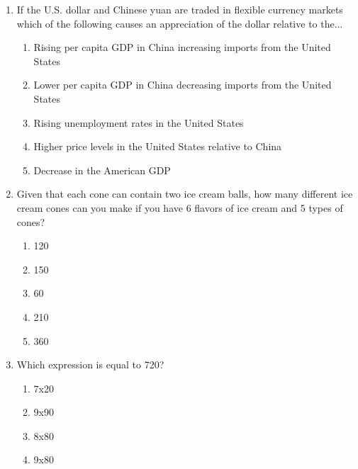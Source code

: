 \documentclass[12pt]{article}
\begin{document}
\begin{enumerate}[label=\arabic*.]
\begin{enumerate}[label=(\alph*)]
    \item 20.0
    \item 18.0
\end{enumerate}
\item If the U.S. dollar and Chinese yuan are traded in flexible currency markets which of the following causes an appreciation of the dollar relative to the...
\begin{enumerate}[label=(\alph*)]
    \item Rising per capita GDP in China increasing imports from the United States
    \item Lower per capita GDP in China decreasing imports from the United States
    \item Rising unemployment rates in the United States
    \item Higher price levels in the United States relative to China
    \item Decrease in the American GDP
\end{enumerate}
\item Given that each cone can contain two ice cream balls, how many different ice cream cones can you make if you have 6 flavors of ice cream and 5 types of cones?
\begin{enumerate}[label=(\alph*)]
    \item 120
    \item 150
    \item 60
    \item 210
    \item 360
\end{enumerate}
\item Which expression is equal to 720?
\begin{enumerate}[label=(\alph*)]
    \item 7x20
    \item 9x90
    \item 8x80
    \item 9x80
\end{enumerate}
\end{enumerate}
\end{document}
